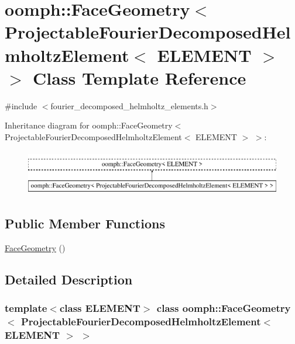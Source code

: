 \hypertarget{classoomph_1_1FaceGeometry_3_01ProjectableFourierDecomposedHelmholtzElement_3_01ELEMENT_01_4_01_4}{}\section{oomph\+:\+:Face\+Geometry$<$ Projectable\+Fourier\+Decomposed\+Helmholtz\+Element$<$ E\+L\+E\+M\+E\+NT $>$ $>$ Class Template Reference}
\label{classoomph_1_1FaceGeometry_3_01ProjectableFourierDecomposedHelmholtzElement_3_01ELEMENT_01_4_01_4}


{\ttfamily \#include $<$fourier\+\_\+decomposed\+\_\+helmholtz\+\_\+elements.\+h$>$}

Inheritance diagram for oomph\+:\+:Face\+Geometry$<$ Projectable\+Fourier\+Decomposed\+Helmholtz\+Element$<$ E\+L\+E\+M\+E\+NT $>$ $>$\+:\begin{figure}[H]
\begin{center}
\leavevmode
\includegraphics[height=2.000000cm]{classoomph_1_1FaceGeometry_3_01ProjectableFourierDecomposedHelmholtzElement_3_01ELEMENT_01_4_01_4}
\end{center}
\end{figure}
\subsection*{Public Member Functions}
\begin{DoxyCompactItemize}
\item 
\hyperlink{classoomph_1_1FaceGeometry_3_01ProjectableFourierDecomposedHelmholtzElement_3_01ELEMENT_01_4_01_4_ae66c47760c8d9585eac5259781f88b32}{Face\+Geometry} ()
\end{DoxyCompactItemize}


\subsection{Detailed Description}
\subsubsection*{template$<$class E\+L\+E\+M\+E\+NT$>$\newline
class oomph\+::\+Face\+Geometry$<$ Projectable\+Fourier\+Decomposed\+Helmholtz\+Element$<$ E\+L\+E\+M\+E\+N\+T $>$ $>$}

